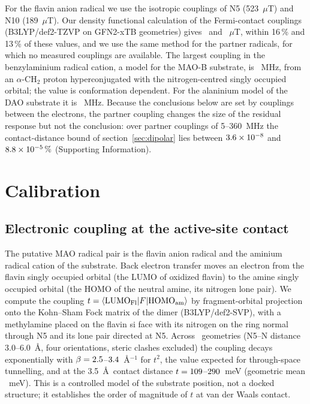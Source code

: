 \documentclass[journal=jpcbfk,manuscript=article,layout=traditional]{achemso}
\begin{document}
For the flavin anion radical we use the isotropic couplings of N5 (523~$\mu$T)
and N10 (189~$\mu$T).\cite{Lee2014} Our density functional calculation of the
Fermi-contact couplings (B3LYP/def2-TZVP on GFN2-xTB geometries) gives
\aNfiveDFT\ and \aNtenDFT~$\mu$T, within 16\,\% and 13\,\% of these values, and we
use the same method for the partner radicals, for which no measured couplings
are available. The largest coupling in the benzylaminium radical cation, a
model for the MAO-B substrate, is \partnerMAO~MHz, from an $\alpha$-CH$_2$ proton
hyperconjugated with the nitrogen-centred singly occupied orbital; the value is
conformation dependent. For the alaninium model of the DAO substrate it is
\partnerDAO~MHz. Because the conclusions below are set by couplings
between the electrons, the partner coupling changes the size of the residual
response but not the conclusion: over partner couplings of 5--360~MHz the
contact-distance bound of section~\ref{sec:dipolar} lies between
$3.6\times10^{-8}$ and $8.8\times10^{-5}\,\%$ (Supporting Information).

\section{Calibration}

\subsection{Electronic coupling at the active-site contact}

The putative MAO radical pair is the flavin anion radical and the aminium radical
cation of the substrate. Back electron transfer moves an electron from the
flavin singly occupied orbital (the LUMO of oxidized flavin) to the amine singly
occupied orbital (the HOMO of the neutral amine, its nitrogen lone pair). We
compute the coupling $t = \langle{\rm LUMO_{Fl}}|F|{\rm HOMO_{am}}\rangle$ by
fragment-orbital projection onto the Kohn--Sham Fock matrix of the dimer
(B3LYP/def2-SVP),\cite{Valeev2006} with a methylamine placed on the flavin si face
with its nitrogen on the ring normal through N5 and its lone pair directed at N5.
Across \nScanPoints\ geometries (N5--N distance 3.0--6.0~\AA, four orientations,
steric clashes excluded) the coupling decays exponentially with
$\beta = 2.5$--$3.4$~\AA$^{-1}$ for $t^2$, the value expected for
through-space tunnelling, and at the 3.5~\AA\ contact distance
$t = 109$--$290$~meV (geometric mean \tContactGeo~meV). This is
a controlled model of the substrate position, not a docked structure; it
establishes the order of magnitude of $t$ at van der Waals contact.
\end{document}
